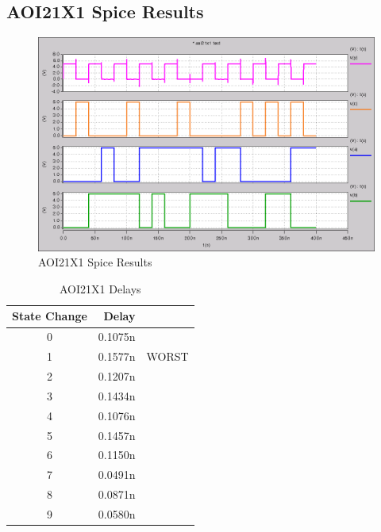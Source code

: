     \subsection{AOI21X1 Spice Results}
        
        \begin{figure}[H]
            \centering
            \includegraphics[width=0.75\linewidth]{../../spice/aoi21x1.png}
            \caption{AOI21X1 Spice Results}
        \end{figure}
        \begin{table}[H]
            \centering
            \begin{tabular}{crc}
                \toprule
                \textbf{State Change} & \textbf{Delay} & \\
                \midrule
                0 & 0.1075n & \\
                1 & 0.1577n & WORST \\
                2 & 0.1207n & \\
                3 & 0.1434n & \\
                4 & 0.1076n & \\
                5 & 0.1457n & \\
                6 & 0.1150n & \\
                7 & 0.0491n & \\
                8 & 0.0871n & \\
                9 & 0.0580n & \\
                \bottomrule
            \end{tabular}
            \caption{AOI21X1 Delays}
        \end{table}

    \newpage
